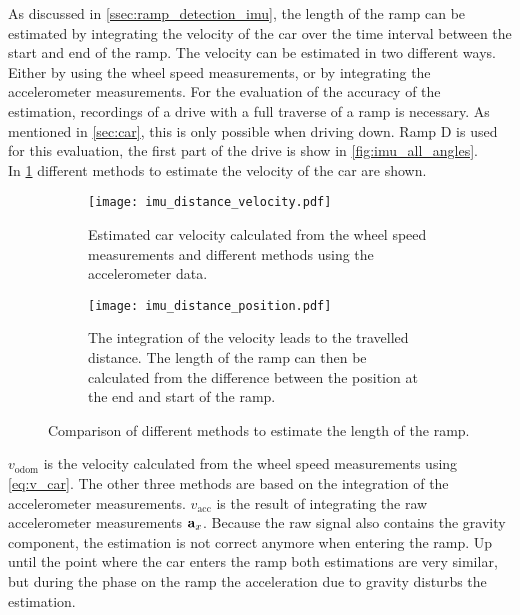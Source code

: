 As discussed in \cref{ssec:ramp_detection_imu}, the length of the ramp can be estimated by integrating the velocity of the car over the time interval between the start and end of the ramp.
The velocity can be estimated in two different ways.
Either by using the wheel speed measurements, or by integrating the accelerometer measurements.
For the evaluation of the accuracy of the estimation, recordings of a drive with a full traverse of a ramp is necessary.
As mentioned in \cref{sec:car}, this is only possible when driving down.
Ramp D is used for this evaluation, the first part of the drive is show in \cref{fig:imu_all_angles}.\\
In \cref{fig:imu_distance_velocity} different methods to estimate the velocity of the car are shown.
\begin{figure}[htb]
    \centering
    \begin{subfigure}{1\textwidth}
        \centering
        \texttt{[image: imu\_distance\_velocity.pdf]}
        \caption[Car velocity estimation]{Estimated car velocity calculated from the wheel speed measurements and different methods using the accelerometer data.}
        \label{fig:imu_distance_velocity}
    \end{subfigure}
    
    \begin{subfigure}{1\textwidth}
        \centering
        \texttt{[image: imu\_distance\_position.pdf]}
        \caption[Car travelled distance estimation]{The integration of the velocity leads to the travelled distance. The length of the ramp can then be calculated from the difference between the position at the end and start of the ramp.}
        \label{fig:imu_distance_position}
    \end{subfigure}
    \caption[Ramp length estimation using various methods]{Comparison of different methods to estimate the length of the ramp.}
\end{figure}
$v_\mathrm{odom}$ is the velocity calculated from the wheel speed measurements using \cref{eq:v_car}.
The other three methods are based on the integration of the accelerometer measurements.
$v_\mathrm{acc}$ is the result of integrating the raw accelerometer measurements $\vb{a}_x$.
Because the raw signal also contains the gravity component, the estimation is not correct anymore when entering the ramp.
Up until the point where the car enters the ramp both estimations are very similar, but during the phase on the ramp the acceleration due to gravity disturbs the estimation.

